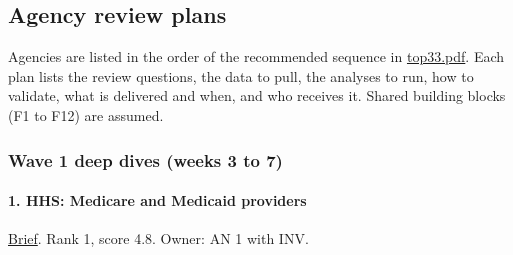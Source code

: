 \documentclass[letterpaper,11pt]{article}
\begin{document}
\hypertarget{agency-review-plans}{%
\subsection{Agency review plans}\label{agency-review-plans}}

Agencies are listed in the order of the recommended sequence in
\href{agencies/top33.pdf}{top33.pdf}. Each plan lists the review
questions, the data to pull, the analyses to run, how to validate, what
is delivered and when, and who receives it. Shared building blocks (F1
to F12) are assumed.

\hypertarget{wave-1-deep-dives-weeks-3-to-7}{%
\subsubsection{Wave 1 deep dives (weeks 3 to
7)}\label{wave-1-deep-dives-weeks-3-to-7}}

\hypertarget{hhs-medicare-and-medicaid-providers}{%
\paragraph{1. HHS: Medicare and Medicaid
providers}\label{hhs-medicare-and-medicaid-providers}}

\href{agencies/hhs.pdf}{Brief}. Rank 1, score 4.8. Owner: AN 1 with INV.
\end{document}
